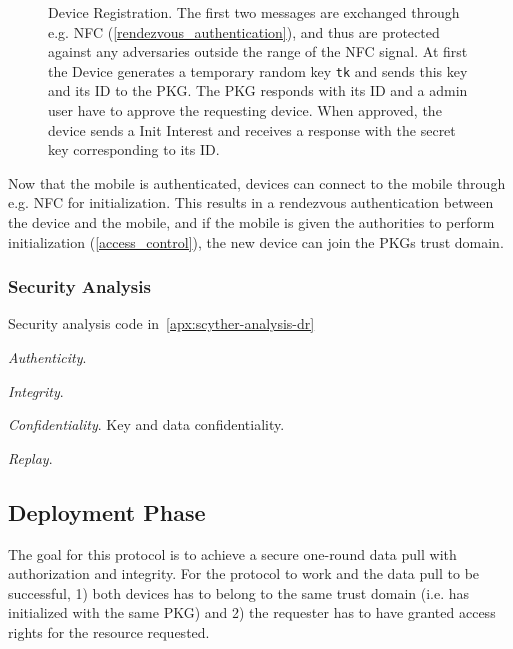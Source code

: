 \begin{figure}[H]
  \caption{Device Registration. 
  The first two messages are exchanged through e.g. NFC (\autoref{rendezvous_authentication}), and thus are protected against any adversaries outside the range of the NFC signal. 
  At first the Device generates a temporary random key \texttt{tk} and sends this key and its ID to the PKG. 
  The PKG responds with its ID and a admin user have to approve the requesting device.
  When approved, the device sends a Init Interest and receives a response with the secret key corresponding to its ID.
  }
  \label{fig:init_ibe_1}
\end{figure}



Now that the mobile is authenticated, devices can connect to the mobile through e.g. \gls{NFC} for initialization.
This results in a rendezvous authentication between the device and the mobile, and if the mobile is given the authorities to perform initialization (\autoref{access_control}), the new device can join the \gls{PKG}s trust domain.

\subsubsection{Security Analysis}
Security analysis code in~\autoref{apx:scyther-analysis-dr}

\textit{Authenticity}.

\textit{Integrity}.

\textit{Confidentiality}. Key and data confidentiality.

\textit{Replay}.

\subsection{Deployment Phase}\label{data_pull}
The goal for this protocol is to achieve a secure one-round \gls{data} pull with authorization and integrity.
For the protocol to work and the \gls{data} pull to be successful, 1) both devices has to belong to the same trust domain (i.e. has initialized with the same \gls{PKG}) and 2) the requester has to have granted access rights for the resource requested.

